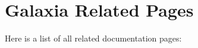 \section{Galaxia Related Pages}
Here is a list of all related documentation pages:\begin{CompactList}
\item {}

\end{CompactList}
